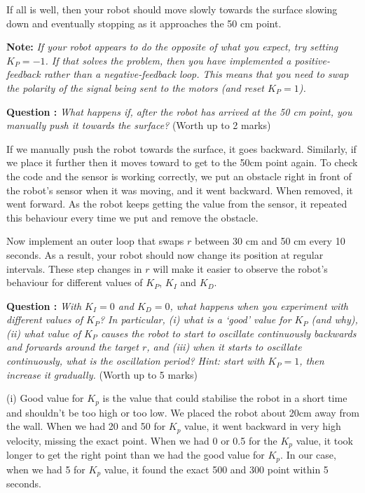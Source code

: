 \documentclass[hidelinks,a4paper,11pt]{article}
\newcounter{question}
\newcommand\myq{\refstepcounter{question}\thequestion}
\begin{document}
If all is well, then your robot should move slowly towards the surface slowing down and eventually stopping as it approaches the 50 cm point.

{\bfseries Note:}  \emph{If your robot appears to do the opposite of what you expect, try setting $K_P=-1$.  If that solves the problem, then you have implemented a positive-feedback rather than a negative-feedback loop.  This means that you need to swap the polarity of the signal being sent to the motors (and reset $K_P=1$).}

{\bfseries Question \myq:}  \emph{What happens if, after the robot has arrived at the 50 cm point, you manually push it towards the surface?} (Worth up to 2 marks)\\
\begin{mdframed}
If we manually push the robot towards the surface, it goes backward. Similarly, if we place it further then it moves toward to get to the 50cm point again. To check the code and the sensor is working correctly, we put an obstacle right in front of the robot’s sensor when it was moving, and it went backward. When removed, it went forward. As the robot keeps getting the value from the sensor, it repeated this behaviour every time we put and remove the obstacle.
\end{mdframed}
\vspace*{\baselineskip}

Now implement an outer loop that swaps $r$ between 30 cm and 50 cm every 10 seconds.  As a result, your robot should now change its position at regular intervals.  These step changes in $r$ will make it easier to observe the robot's behaviour for different values of $K_P$, $K_I$ and $K_D$.

{\bfseries Question \myq:}  \emph{With $K_I=0$ and $K_D=0$, what happens when you experiment with different values of $K_P$?  In particular, (i) what is a `good' value for $K_P$ (and why), (ii) what value of $K_P$ causes the robot to start to oscillate continuously backwards and forwards around the target $r$, and (iii) when it starts to oscillate continuously, what is the oscillation period?  Hint: start with $K_P =1$, then increase it gradually.} (Worth up to 5 marks)\\
\begin{mdframed}
(i) Good value for $K_p$ is the value that could stabilise the robot in a short time and shouldn't be too high or too low. We placed the robot about 20cm away from the wall. When we had 20 and 50 for $K_p$ value, it went backward in very high velocity, missing the exact point. When we had 0 or 0.5 for the $K_p$ value, it took longer to get the right point than we had the good value for $K_p$. In our case, when we had 5 for $K_p$ value, it found the exact 500 and 300 point within 5 seconds.
\end{mdframed}
\vspace*{\baselineskip}
\end{document}
